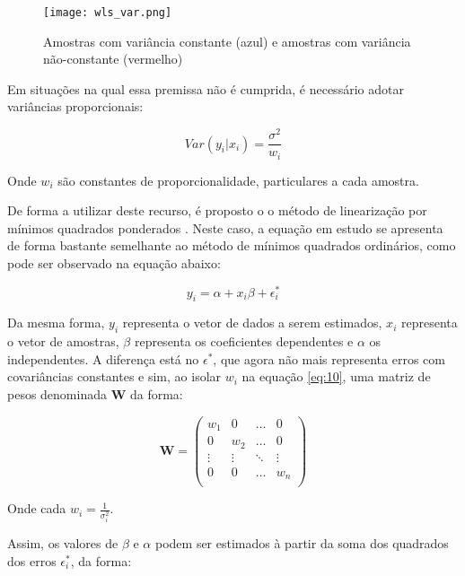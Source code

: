 \begin{figure}[htp]
    \centering
    \texttt{[image: wls\_var.png]}
    \caption{Amostras com variância constante (azul) e amostras com variância não-constante (vermelho)}
    \label{fig:outlier}
\end{figure}

Em situações na qual essa premissa não é cumprida, é necessário adotar variâncias proporcionais:

\begin{equation}\label{eq:10}
Var(y_i|x_i) = \frac{\sigma^2}{w_i}
\end{equation}

Onde $w_i$ são constantes de proporcionalidade, particulares a cada amostra.

De forma a utilizar deste recurso, é proposto o o método de linearização por mínimos quadrados ponderados  \cite{reg_analysis_weighted} \cite{weighted_taconeli}. Neste caso, a equação em estudo se apresenta de forma bastante semelhante ao método de mínimos quadrados ordinários, como pode ser observado na equação abaixo:

\begin{equation}\label{eq:11}
y_i = \alpha + x_i\beta +\epsilon_i^\ast
\end{equation}

Da mesma forma, $y_i$ representa o vetor de dados a serem estimados, $x_i$ representa o vetor de amostras, $\beta$ representa os coeficientes dependentes e $\alpha$ os independentes. A diferença está no $\epsilon^\ast$, que agora não mais representa erros com covariâncias constantes e sim, ao isolar $w_i$ na equação \ref{eq:10}, uma matriz de pesos denominada \textbf{W} da forma:

\begin{equation*}\textbf{W}=\left( \begin{array}{cccc} w_{1} & 0 & \ldots & 0 \\ 0& w_{2} & \ldots & 0 \\ \vdots & \vdots & \ddots & \vdots \\ 0& 0 & \ldots & w_{n} \\ \end{array} \right) \end{equation*}

Onde cada $w_i = \frac{1}{\sigma_i^2}$.

Assim, os valores de $\beta$ e $\alpha$ podem ser estimados à partir da soma dos quadrados dos erros $\epsilon_i^\ast$, da forma:

